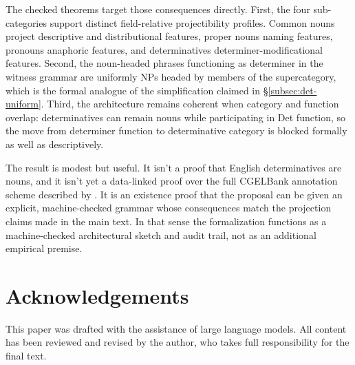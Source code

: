 \documentclass[12pt]{article}
\begin{document}
The checked theorems target those consequences directly. First, the four sub-categories support distinct field-relative projectibility profiles. Common nouns project descriptive and distributional features, proper nouns naming features, pronouns anaphoric features, and determinatives determiner-modificational features. Second, the noun-headed phrases functioning as determiner in the witness grammar are uniformly NPs headed by members of the  supercategory, which is the formal analogue of the simplification claimed in §\ref{subsec:det-uniform}. Third, the architecture remains coherent when category and function overlap: determinatives can remain nouns while participating in Det function, so the move from determiner function to determinative category is blocked formally as well as descriptively.

The result is modest but useful. It isn't a proof that English determinatives are nouns, and it isn't yet a data-linked proof over the full CGELBank annotation scheme described by \textcite{reynolds2025cgelbankmanual}. It is an existence proof that the proposal can be given an explicit, machine-checked grammar whose consequences match the projection claims made in the main text. In that sense the formalization functions as a machine-checked architectural sketch and audit trail, not as an additional empirical premise.

\section*{Acknowledgements}

This paper was drafted with the assistance of large language models. All content has been reviewed and revised by the author, who takes full responsibility for the final text.

\newpage
\printbibliography
\end{document}
